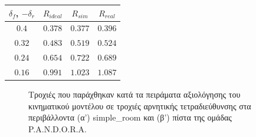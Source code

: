 \begin{table}[!ht]
	\centering
	\label{tab:counter_steering_experiment}
	\begin{tabular}{c | c |  c | c}
	 	\textbf{$\delta_f$}, \textbf{$-\delta_r$} & \textbf{$R_{ideal}$} & \textbf{$R_{sim}$} & \textbf{$R_{real}$} \\ \hline
	   $0.4$ & $0.378$ & $0.377$ & $0.396$\\
 	   $0.32$ & $0.483$ & $0.519$ & $0.524$\\
  	   $0.24$ & $0.654$ & $0.722$ & $0.689$\\
   	   $0.16$ & $0.991$ & $1.023$ & $1.087$
   	\end{tabular}
\end{table}

\begin{figure}[!ht]
	\centering
	 \hspace{1cm}
	\caption{Τροχιές που παράχθηκαν κατά τα πειράματα αξιολόγησης του κινηματικού μοντέλου σε τροχιές αρνητικής τετραδιεύθυνσης στα περιβάλλοντα (α') simple{\_}room και (β') πίστα της ομάδας P.A.N.D.O.R.A.}
	\label{fig:counter_steering_experiment}
\end{figure}


